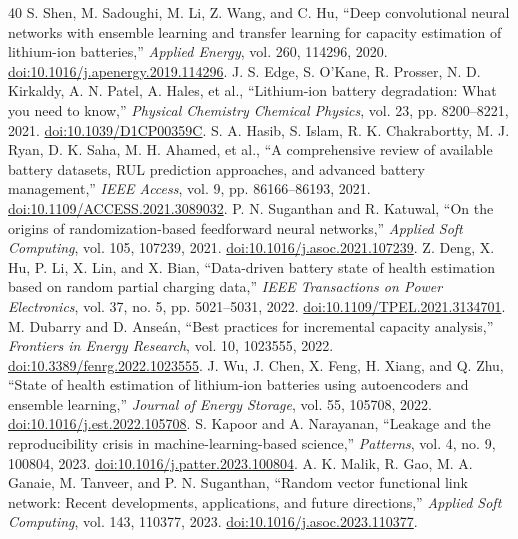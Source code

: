 \begin{thebibliography}{40}
 S. Shen, M. Sadoughi, M. Li, Z. Wang, and C. Hu, ``Deep convolutional neural networks with ensemble learning and transfer learning for capacity estimation of lithium-ion batteries,'' \emph{Applied Energy}, vol. 260, 114296, 2020. \href{https://doi.org/10.1016/j.apenergy.2019.114296}{doi:10.1016/j.apenergy.2019.114296}.
 J. S. Edge, S. O'Kane, R. Prosser, N. D. Kirkaldy, A. N. Patel, A. Hales, et al., ``Lithium-ion battery degradation: What you need to know,'' \emph{Physical Chemistry Chemical Physics}, vol. 23, pp. 8200--8221, 2021. \href{https://doi.org/10.1039/D1CP00359C}{doi:10.1039/D1CP00359C}.
 S. A. Hasib, S. Islam, R. K. Chakrabortty, M. J. Ryan, D. K. Saha, M. H. Ahamed, et al., ``A comprehensive review of available battery datasets, RUL prediction approaches, and advanced battery management,'' \emph{IEEE Access}, vol. 9, pp. 86166--86193, 2021. \href{https://doi.org/10.1109/ACCESS.2021.3089032}{doi:10.1109/ACCESS.2021.3089032}.
 P. N. Suganthan and R. Katuwal, ``On the origins of randomization-based feedforward neural networks,'' \emph{Applied Soft Computing}, vol. 105, 107239, 2021. \href{https://doi.org/10.1016/j.asoc.2021.107239}{doi:10.1016/j.asoc.2021.107239}.
 Z. Deng, X. Hu, P. Li, X. Lin, and X. Bian, ``Data-driven battery state of health estimation based on random partial charging data,'' \emph{IEEE Transactions on Power Electronics}, vol. 37, no. 5, pp. 5021--5031, 2022. \href{https://doi.org/10.1109/TPEL.2021.3134701}{doi:10.1109/TPEL.2021.3134701}.
 M. Dubarry and D. Anse\'an, ``Best practices for incremental capacity analysis,'' \emph{Frontiers in Energy Research}, vol. 10, 1023555, 2022. \href{https://doi.org/10.3389/fenrg.2022.1023555}{doi:10.3389/fenrg.2022.1023555}.
 J. Wu, J. Chen, X. Feng, H. Xiang, and Q. Zhu, ``State of health estimation of lithium-ion batteries using autoencoders and ensemble learning,'' \emph{Journal of Energy Storage}, vol. 55, 105708, 2022. \href{https://doi.org/10.1016/j.est.2022.105708}{doi:10.1016/j.est.2022.105708}.
 S. Kapoor and A. Narayanan, ``Leakage and the reproducibility crisis in machine-learning-based science,'' \emph{Patterns}, vol. 4, no. 9, 100804, 2023. \href{https://doi.org/10.1016/j.patter.2023.100804}{doi:10.1016/j.patter.2023.100804}.
 A. K. Malik, R. Gao, M. A. Ganaie, M. Tanveer, and P. N. Suganthan, ``Random vector functional link network: Recent developments, applications, and future directions,'' \emph{Applied Soft Computing}, vol. 143, 110377, 2023. \href{https://doi.org/10.1016/j.asoc.2023.110377}{doi:10.1016/j.asoc.2023.110377}.

\end{thebibliography}
